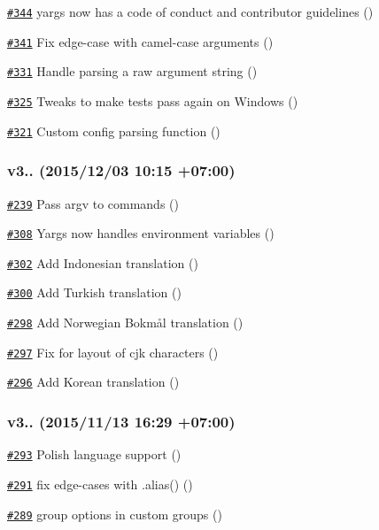 \begin{DoxyItemize}
\item \href{https://github.com/bcoe/yargs/pull/344}{\tt \#344} yargs now has a code of conduct and contributor guidelines ()
\item \href{https://github.com/bcoe/yargs/issues/341}{\tt \#341} Fix edge-\/case with camel-\/case arguments ()
\item \href{https://github.com/bcoe/yargs/pull/331}{\tt \#331} Handle parsing a raw argument string ()
\item \href{https://github.com/bcoe/yargs/pull/325}{\tt \#325} Tweaks to make tests pass again on Windows ()
\item \href{https://github.com/bcoe/yargs/pull/321}{\tt \#321} Custom config parsing function ()
\end{DoxyItemize}

\subsubsection*{v3.. (2015/12/03 10\+:15 +07\+:00)}


\begin{DoxyItemize}
\item \href{https://github.com/bcoe/yargs/pull/239}{\tt \#239} Pass argv to commands ()
\item \href{https://github.com/bcoe/yargs/pull/308}{\tt \#308} Yargs now handles environment variables ()
\item \href{https://github.com/bcoe/yargs/pull/302}{\tt \#302} Add Indonesian translation ()
\item \href{https://github.com/bcoe/yargs/pull/300}{\tt \#300} Add Turkish translation ()
\item \href{https://github.com/bcoe/yargs/pull/298}{\tt \#298} Add Norwegian Bokmål translation ()
\item \href{https://github.com/bcoe/yargs/pull/297}{\tt \#297} Fix for layout of cjk characters ()
\item \href{https://github.com/bcoe/yargs/pull/296}{\tt \#296} Add Korean translation ()
\end{DoxyItemize}

\subsubsection*{v3.. (2015/11/13 16\+:29 +07\+:00)}


\begin{DoxyItemize}
\item \href{https://github.com/bcoe/yargs/pull/293}{\tt \#293} Polish language support ()
\item \href{https://github.com/bcoe/yargs/pull/291}{\tt \#291} fix edge-\/cases with {\ttfamily .alias()} ()
\item \href{https://github.com/bcoe/yargs/pull/289}{\tt \#289} group options in custom groups ()
\end{DoxyItemize}

